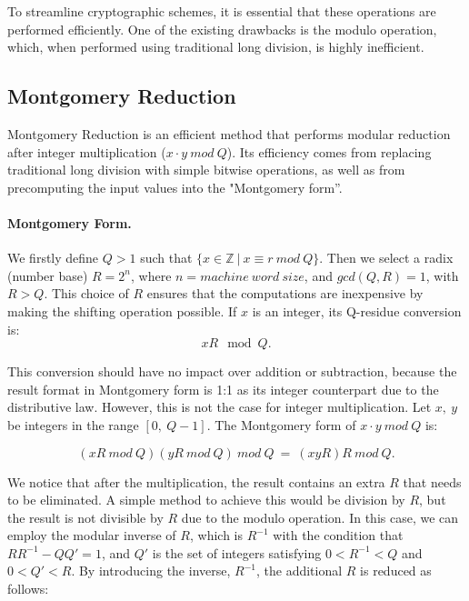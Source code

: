 \documentclass[11pt,
  titlepage=false,
  abstract=on,
]{scrreprt}
\begin{document}
To streamline cryptographic schemes, it is essential that these operations are performed efficiently. One of the existing drawbacks is the modulo operation, which, 
when performed using traditional long division, is highly inefficient.


\subsection{Montgomery Reduction}
Montgomery Reduction \cite{montgomery1985modular} is an efficient method that performs modular reduction after integer multiplication ($x \cdot y\ mod\ Q$).
Its efficiency comes from replacing traditional long division with simple bitwise operations, as well as from precomputing the input values into the "Montgomery form''.

\paragraph{Montgomery Form.} We firstly define $Q > 1$ such that $\{x \in \mathbb{Z}\ |\ x \equiv r\ mod\ Q\}$. Then we select a radix (number base) $R = 2^n$, where 
$n = machine\ word\ size$, and $gcd(Q, R) = 1$, with $R > Q$. This choice of $R$ ensures that the computations are inexpensive by making the shifting operation possible.
If $x$ is an integer, its Q-residue conversion is:
\begin{equation*}
  xR \mod Q. 
\end{equation*}

This conversion should have no impact over addition or subtraction, because the result format in Montgomery
form is 1:1 as its integer counterpart due to the distributive law.
However, this is not the case for integer multiplication. Let $x,\ y$ be integers in the range $[0,\ Q-1]$. The Montgomery form of $x\cdot y\ mod\ Q$ is:

\begin{equation*}
  (xR\ mod\ Q)(yR\ mod\ Q)\ mod\ Q\ =\ (xyR)R\ mod\ Q.
\end{equation*}

We notice that after the multiplication, the result contains an extra $R$ that needs to be eliminated. A simple method to achieve this would be division by $R$, but
the result is not divisible by $R$ due to the modulo operation. In this case, we can employ the modular inverse of $R$, which is $R^{-1}$ with the condition that $RR^{-1} - QQ' = 1$,
and $Q'$ is the set of integers satisfying  $0 < R^{-1} < Q$ and $0 < Q' < R$.
By introducing the inverse, $R^{-1}$, the additional $R$ is reduced as follows:
\end{document}
